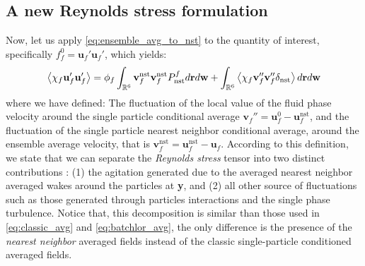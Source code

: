 \subsection{A new Reynolds stress formulation}

Now, let us apply \ref{eq:ensemble_avg_to_nst} to the quantity of interest, specifically $f_f^0 = \textbf{u}_f'\textbf{u}_f'$, which yields: 
\begin{equation}
    \avg{\chi_f \textbf{u}_f'\textbf{u}_f'}
    = 
    \phi_f
    \int_{\mathbb{R}^6}
    \textbf{v}_f^\text{nst}
    \textbf{v}_f^\text{nst}
    P_\text{nst}^f
    d\textbf{r}
    d\textbf{w}
    + 
    \int_{\mathbb{R}^6}
    \avg{
        \chi_f
        \textbf{v}_f''
        \textbf{v}_f''
        \delta_\text{nst}
    }
    d\textbf{r}
    d\textbf{w}
    \label{eq:relation_ensemble_nst}
\end{equation}
where we have defined: 
The fluctuation of the local value of the fluid phase velocity around the single particle conditional average $\textbf{v}_f'' = \textbf{u}_f^0 - \textbf{u}_f^\text{nst}$, and the fluctuation of the single particle nearest neighbor conditional average, around the ensemble average velocity, that is $\textbf{v}_f^\text{nst} = \textbf{u}_f^\text{nst} - \textbf{u}_f$. 
According to this definition, 
we state that we can separate the \textit{Reynolds stress} tensor into two distinct contributions :  (1) the agitation generated due to the averaged nearest neighbor averaged wakes around the particles at \textbf{y}, and (2) all other source of fluctuations such as those generated through particles interactions and the single phase turbulence. 
Notice that, this decomposition is similar than those used in \ref{eq:classic_avg} and \ref{eq:batchlor_avg}, the only difference is the presence of the \textit{nearest neighbor} averaged fields instead of the classic single-particle conditioned averaged fields. 

